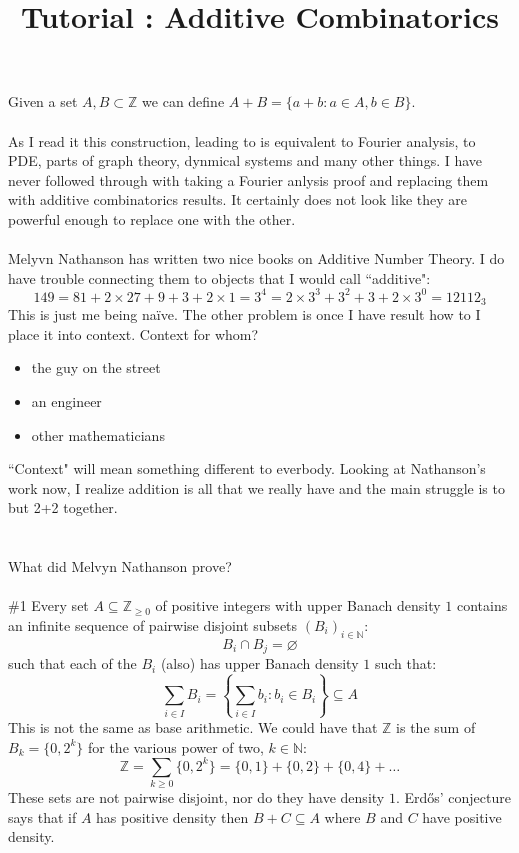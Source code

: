 \documentclass[12pt]{article}
\title{Tutorial : Additive Combinatorics}
\date{}
\begin{document}
\selectfont \fontsize{12.5}{15}\selectfont

\maketitle

\noindent Given a set $A, B \subset \mathbb{Z}$ we can define $A + B = \{ a + b: a \in A , b \in B \}$.  \\ \\
As I read it this construction, leading to {\color{yellow!60!black}} is equivalent to Fourier analysis, to PDE, parts of graph theory, dynmical systems and many other things.  I have never followed through with taking a Fourier anlysis proof and replacing them with additive combinatorics results.  It certainly does not look like they are powerful enough to replace one with the other. \\ \\
Melyvn Nathanson has written two nice books on Additive Number Theory.  I do have trouble connecting them to objects that I would call ``additive": 
$$ 149 = 81 + 2 \times 27 + 9 + 3 + 2 \times 1= 3^4 = 2 \times 3^3 + 3^2 + 3 + 2 \times 3^0 =  12112_3 $$
This is just me being na\"{i}ve.  The other problem is once I have result how to I place it into context.  Context for whom?
\begin{itemize}
\item the guy on the street
\item an engineer
\item other mathematicians
\end{itemize}
``Context" will mean something different to everbody.  Looking at Nathanson's work now, I realize addition is all that we really have and the main struggle is to but 2+2 together. \\ \\ \\
What did Melvyn Nathanson prove? \\ \\
\#1 Every set $A \subseteq \mathbb{Z}_{\geq 0}$ of positive integers with upper Banach density $1$ contains an infinite sequence of pairwise disjoint subsets $(B_i)_{i \in \mathbb{N}}$:
$$  B_i \cap B_j = \varnothing $$
such that each of the $B_i$ (also) has upper Banach density $1$ such that:
$$ \sum_{i \in I} B_i = \left\{ \sum_{i \in I} b_i : b_i \in B_i  \right\}  \subseteq A $$
This is not the same as base arithmetic.  We could have that $\mathbb{Z}$ is the sum of $B_k = \{ 0, 2^k \}$ for the various power of two, $k \in \mathbb{N}$:
$$ \mathbb{Z} = \sum_{k \geq 0} \big\{ 0, 2^k \big\} = \{ 0 , 1\} + \{ 0, 2 \} + \{ 0, 4 \} + \dots $$
These sets are not pairwise disjoint, nor do they have density $1$.  Erd\H{o}s' conjecture says that if $A$ has positive density then $B + C \subseteq A$ where $B$ and $C$ have positive density. 
\end{document}
